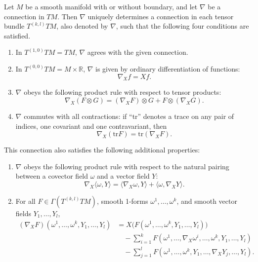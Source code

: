 \begin{proposition}\label{prop:connection-on-tensor-bundles}
Let $M$ be a smooth manifold with or without boundary, and let $\nabla$ be a connection in $TM$. Then $\nabla$ uniquely determines a connection in each tensor bundle $T^{(k,l)}TM$, also denoted by $\nabla$, such that the following four conditions are satisfied.
\begin{enumerate}
\item[(i)] In $T^{(1,0)}TM = TM$, $\nabla$ agrees with the given connection.
\item[(ii)] In $T^{(0,0)}TM = M \times \mathbb{R}$, $\nabla$ is given by ordinary differentiation of functions:
\[\nabla_X f = Xf.\]
\item[(iii)] $\nabla$ obeys the following product rule with respect to tensor products:
\[\nabla_X (F \otimes G) = (\nabla_X F) \otimes G + F \otimes (\nabla_X G).\]
\item[(iv)] $\nabla$ commutes with all contractions: if ``tr'' denotes a trace on any pair of indices, one covariant and one contravariant, then
\[\nabla_X (\mathrm{tr} F) = \mathrm{tr}(\nabla_X F).\]
\end{enumerate}

This connection also satisfies the following additional properties:
\begin{enumerate}
\item[(a)] $\nabla$ obeys the following product rule with respect to the natural pairing between a covector field $\omega$ and a vector field $Y$:
\[\nabla_X \langle \omega, Y \rangle = \langle \nabla_X \omega, Y \rangle + \langle \omega, \nabla_X Y \rangle.\]
\item[(b)] For all $F \in \Gamma(T^{(k,l)}TM)$, smooth 1-forms $\omega^1, \ldots, \omega^k$, and smooth vector fields $Y_1, \ldots, Y_l$,
\begin{align}
  (\nabla_X F)(\omega^1,\ldots,\omega^k, Y_1,\ldots,Y_l) &= X\big(F(\omega^1,\ldots,\omega^k, Y_1,\ldots,Y_l)\big) \nonumber\\
  &\quad - \sum_{i=1}^{k} F(\omega^1,\ldots,\nabla_X\omega^i,\ldots,\omega^k, Y_1,\ldots,Y_l) \nonumber\\
  &\quad - \sum_{j=1}^{l} F(\omega^1,\ldots,\omega^k, Y_1,\ldots,\nabla_X Y_j,\ldots,Y_l). \label{eq:4.12}\tag{4.12}
\end{align}
\end{enumerate}
\end{proposition}

